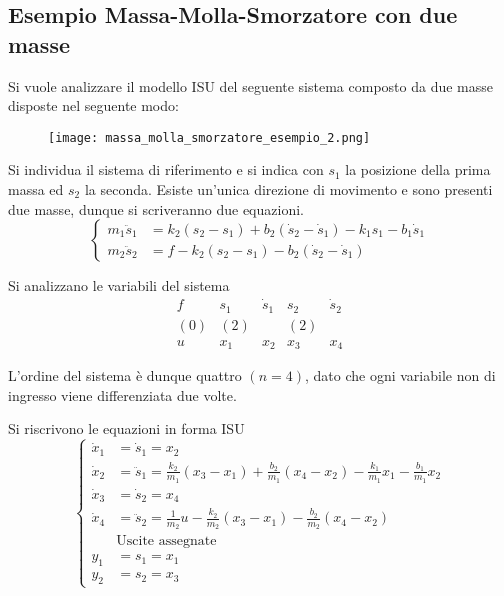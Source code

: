 
\subsection{Esempio Massa-Molla-Smorzatore con due masse}
Si vuole analizzare il modello ISU del seguente sistema composto da due masse
disposte nel seguente modo:
\begin{figure}[h]
 \centering
 \texttt{[image: massa\_molla\_smorzatore\_esempio\_2.png]}
 \label{fig:massa_molla_smorzatore_esempio_2}
\end{figure}

Si individua il sistema di riferimento e si indica con $s_1$ la posizione della
prima massa ed $s_2$ la seconda.
Esiste un'unica direzione di movimento e sono presenti due masse, dunque si
scriveranno due equazioni.
$$\left\{\begin{aligned}
m_1\ddot{s}_1 &= k_2(s_2-s_1) + b_2(\dot{s}_2-\dot{s}_1) -k_1s_1 - b_1\dot{s}_1
\\
m_2\ddot{s}_2 &= f - k_2(s_2-s_1) - b_2(\dot{s}_2-\dot{s}_1)
\end{aligned}\right.$$

Si analizzano le variabili del sistema
$$\begin{matrix}
f & s_1& \dot{s}_1 & s_2 &\dot{s}_2 \\
(0) & (2) & & (2) \\
u & x_1 & x_2 & x_3 & x_4
\end{matrix}$$

L'ordine del sistema è dunque quattro $(n=4)$, dato che ogni variabile non di
ingresso viene differenziata due volte.

Si riscrivono le equazioni in forma ISU
$$\left\{\begin{aligned}
\dot{x}_1 &= \dot{s}_1 = x_2 \\
\dot{x}_2 &= \ddot{s}_1 = \frac{k_2}{m_1}(x_3-x_1) + \frac{b_2}{m_1} (x_4-x_2)
- \frac{k_1}{m_1}x_1 - \frac{b_1}{m_1}x_2\\
\dot{x}_3 &=\dot{s}_2 = x_4 \\
\dot{x}_4 &= \ddot{s}_2 = \frac{1}{m_2}u -\frac{k_2}{m_2}(x_3-x_1) -
\frac{b_2}{m_2}(x_4 - x_2)\\
\ &\text{Uscite assegnate}\\
y_1 &= s_1 = x_1 \\
y_2 &= s_2 = x_3
\end{aligned}\right.$$


